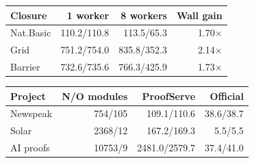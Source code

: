 \begin{tabular}{lrrr}
\toprule
Closure & 1 worker & 8 workers & Wall gain\\
\midrule
Nat.Basic & 110.2/110.8 & 113.5/65.3 & 1.70$\times$\\
Grid & 751.2/754.0 & 835.8/352.3 & 2.14$\times$\\
Barrier & 732.6/735.6 & 766.3/425.9 & 1.73$\times$\\
\bottomrule
\end{tabular}
\par\medskip
\begin{tabular}{lrrr}
\toprule
Project & N/O modules & ProofServe & Official\\
\midrule
Newspeak & 754/105 & 109.1/110.6 & 38.6/38.7\\
Solar & 2368/12 & 167.2/169.3 & 5.5/5.5\\
AI proofs & 10753/9 & 2481.0/2579.7 & 37.4/41.0\\
\bottomrule
\end{tabular}
